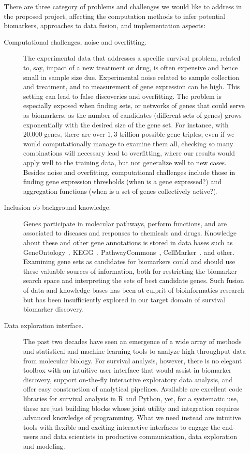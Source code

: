 \documentclass[11pt,a4paper]{article}
\renewcommand{\bf}{\textbf}
\begin{document}
{\bf There are three category of problems and challenges we would like to address in the proposed project, affecting the computation methods to infer potential biomarkers, approaches to data fusion, and implementation aspects:}
\begin{description}
	\item[Computational challenges, noise and overfitting.] The experimental data that addresses a specific survival problem, related to, say, impact of a new treatment or drug, is often expensive and hence small in sample size due. Experimental noise related to sample collection and treatment, and to measurement of gene expression can be high. This setting can lead to false discoveries and overfitting. The problem is especially exposed when finding sets, or networks of genes that could serve as biomarkers, as the number of candidates (different sets of genes) grows exponentially with the desired size of the gene set. For instance, with $20.000$ genes, there are over $1,3$ trillion possible gene triples; even if we would computationally manage to examine them all, checking so many combinations will necessary lead to overfitting, where our results would apply well to the training data, but not generalize well to new cases. Besides noise and overfitting, computational challenges include those in finding gene expression thresholds (when is a gene expressed?) and aggregation functions (when is a set of genes collectively active?).
	\item[Inclusion ob background knowledge.] Genes participate in molecular pathways, perform functions, and are associated to diseases and responses to chemicals and drugs. Knowledge about these and other gene annotations is stored in data bases such as GeneOntology~\cite{}, KEGG~\cite{}, PathwayCommons~\cite{}, CellMarker~\cite{}, and other. Examining gene sets as candidates for biomarkers could and should use these valuable sources of information, both for restricting the biomarker search space and interpreting the sets of best candidate genes. Such fusion of data and knowledge bases has been at culprit of bioinformatics research~\cite{} but has been insufficiently explored in our target domain of survival biomarker discovery.
	\item[Data exploration interface.] The past two decades have seen an emergence of a wide array of methods and statistical and machine learning tools to analyze high-throughput data from molecular biology. For survival analysis, however, there is no elegant toolbox with an intuitive user interface that would assist in biomarker discovery, support on-the-fly interactive exploratory data analysis, and offer easy construction of analytical pipelines. Available are excellent code libraries for survival analysis in R and Python, yet, for a systematic use, these are just building blocks whose joint utility and integration requires advanced knowledge of programming. What we need instead are intuitive tools with flexible and exciting interactive interfaces to engage the end-users and data scientists in productive communication, data exploration and modeling.
\end{description}
\end{document}
